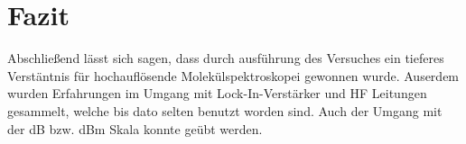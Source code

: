 
\chapter{Fazit}
\label{chap:fazit}

Abschließend lässt sich sagen, dass durch ausführung des Versuches ein tieferes Verstäntnis für hochauflösende Molekülspektroskopei gewonnen wurde. Auserdem wurden Erfahrungen im Umgang mit Lock-In-Verstärker und HF Leitungen gesammelt, welche bis dato selten benutzt worden sind. Auch der Umgang mit der dB bzw. dBm Skala konnte geübt werden. 